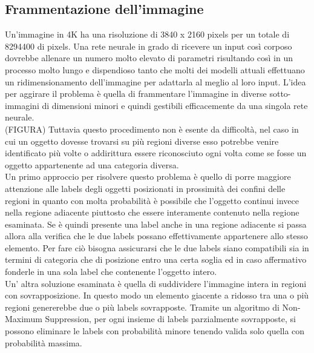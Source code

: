 \subsection{Frammentazione dell'immagine}
Un'immagine in 4K ha una risoluzione di 3840 x 2160 pixels per un totale di 8294400 di pixels. Una rete neurale in grado di ricevere un input così corposo dovrebbe allenare un numero molto elevato di parametri risultando così in un processo molto lungo e dispendioso tanto che molti dei modelli attuali effettuano un ridimensionamento dell'immagine per adattarla al meglio al loro input. L'idea per aggirare il problema è quella di frammentare l'immagine in diverse sotto-immagini di dimensioni minori e quindi gestibili efficacemente da una singola rete neurale.\\
(FIGURA)
Tuttavia questo procedimento non è esente da difficoltà,  nel caso in cui un oggetto dovesse trovarsi su più regioni diverse esso potrebbe venire identificato più volte o addirittura essere riconosciuto ogni volta come se fosse un oggetto appartenente ad una categoria diversa.\\
Un primo approccio per risolvere questo problema è quello di porre maggiore attenzione alle labels degli oggetti posizionati in prossimità dei confini delle regioni in quanto con molta probabilità è possibile che l'oggetto continui invece nella regione adiacente piuttosto che essere interamente contenuto nella regione esaminata. Se è quindi presente una label anche in una regione adiacente si passa allora alla verifica che le due labels possano effettivamente appartenere allo stesso elemento. Per fare ciò bisogna assicurarsi che le due labels siano compatibili sia in termini di categoria che di posizione entro una certa soglia ed in caso affermativo fonderle in una sola label che contenente l'oggetto intero.\\
Un' altra soluzione esaminata è quella di suddividere l'immagine intera in regioni con sovrapposizione. In questo modo un elemento giacente a ridosso tra una o più regioni genererebbe due o più labels sovrapposte. Tramite un algoritmo di Non-Maximum Suppression, per ogni insieme di labels parzialmente sovrapposte, si possono eliminare le labels con probabilità minore tenendo valida solo quella con probabilità massima.